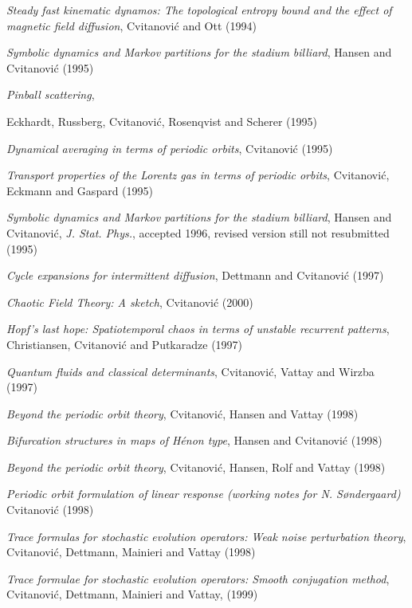 {
{\em Steady fast kinematic dynamos: {The} topological entropy bound and
the effect of magnetic field diffusion},
{Cvitanovi\'c and Ott}
{(1994)}

{\em Symbolic dynamics and {Markov} partitions for the stadium billiard},
{Hansen and Cvitanovi{\'c}}
{(1995)}

{\em Pinball scattering},
{Eckhardt, Russberg, Cvitanovi{\'c, Rosenqvist and Scherer}
{(1995)}

{\em Dynamical averaging in terms of periodic orbits},
{Cvitanovi{\'c}}
{(1995)}

{\em Transport properties of the {Lorentz} gas in terms of periodic orbits},
{Cvitanovi{\'c}, Eckmann and Gaspard}
{(1995)}

{\em Symbolic dynamics and {Markov} partitions for the stadium billiard},
{Hansen and Cvitanovi{\'c}},
{{\em J. Stat. Phys.}, accepted 1996, revised version still not resubmitted}
{(1995)}

{\em Cycle expansions for intermittent diffusion},
 {Dettmann and Cvitanovi{\'c}}
{(1997)}

{\em {Chaotic Field Theory}: {A} sketch},
{Cvitanovi{\'c}}
{(2000)}

{\em Hopf's last hope: {Spatiotemporal} chaos in terms of unstable
recurrent patterns},
{Christiansen, Cvitanovi{\'c} and Putkaradze}
{(1997)}

{\em Quantum fluids and classical determinants},
{Cvitanovi{\'c}, Vattay and Wirzba}
{(1997)}

{\em Beyond the periodic orbit theory},
{Cvitanovi{\'c}, Hansen and Vattay}
{(1998)}

{\em Bifurcation structures in maps of {H\'enon} type},
{Hansen and Cvitanovi{\'c}}
{(1998)}

{\em Beyond the periodic orbit theory},
{Cvitanovi{\'c}, Hansen, Rolf  and Vattay}
{(1998)}

{\em Periodic orbit formulation of linear response (working notes for {N.
S{\o}ndergaard})}
{Cvitanovi{\'c}}
{(1998)}

 {\em Trace formulas for stochastic evolution operators:
{Weak} noise perturbation theory},
{Cvitanovi{\'c}, Dettmann, Mainieri and Vattay}
{(1998)}

{\em Trace formulae for stochastic evolution operators: {Smooth}
conjugation method},
{Cvitanovi{\'c}, Dettmann, Mainieri and Vattay},
{(1999)}

}}
